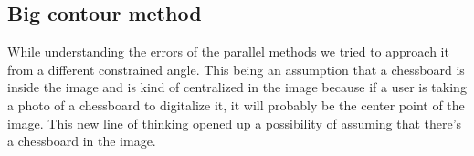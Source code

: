 \subsection{Big contour method}
While understanding the errors of the parallel methods we tried to approach it from a different constrained angle. 
This being an assumption that a chessboard is inside the image and is kind of centralized in the image because if a 
user is taking a photo of a chessboard to digitalize it, it will probably be the center point of the image.
\newline
This new line of thinking opened up a possibility of assuming that there's a chessboard in the image.
\newline
